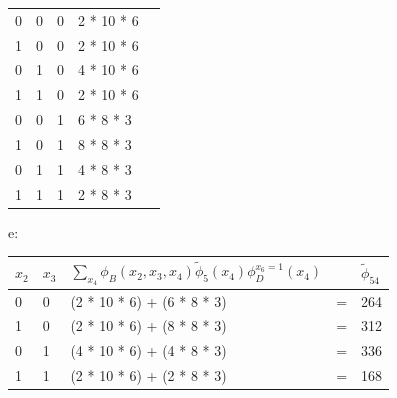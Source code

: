 \begin{exenumerate}
\begin{solution}
\begin{center}
\begin{tabular}{lllll}
                0 & 0 & 0 & 2 * 10 * 6 \\ 
                1 & 0 & 0 & 2 * 10 * 6 \\
                0 & 1 & 0 & 4 * 10 * 6 \\
                1 & 1 & 0 & 2 * 10 * 6 \\
                0 & 0 & 1 & 6 * 8 * 3 \\
                1 & 0 & 1 & 8 * 8 * 3 \\
                0 & 1 & 1 & 4 * 8 * 3 \\
                1 & 1 & 1 & 2 * 8 * 3 \\
                \bottomrule
            \end{tabular}
        \end{center}
        e:
        \begin{center}
            \begin{tabular}{lllll}
                \toprule
                $x_2$ & $x_3$ & $\sum_{x_4} \phi_B(x_2, x_3, x_4) \tilde{\phi}_5(x_4) \phi_D^{x_6=1}(x_4)$ &  & $\tilde{\phi}_{54}$\\
                \midrule
                0 & 0 & (2 * 10 * 6) + (6 * 8 * 3) & = & 264 \\
                1 & 0 & (2 * 10 * 6) + (8 * 8 * 3) & = & 312 \\
                0 & 1 & (4 * 10 * 6) + (4 * 8 * 3) & = & 336 \\
                1 & 1 & (2 * 10 * 6) + (2 * 8 * 3) & = & 168 \\
                \bottomrule
            \end{tabular}
        \end{center}
        

\end{solution}
\end{exenumerate}

